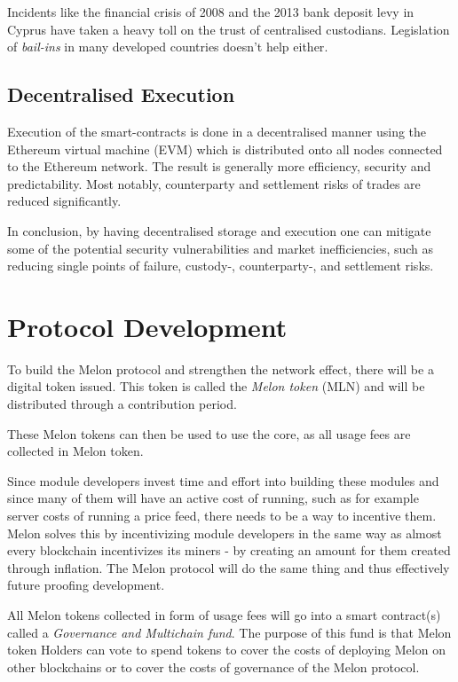 \documentclass[9pt,oneside]{amsart}
\theoremstyle{plain}
\begin{document}
\begin{multicols}{2}
Incidents like the financial crisis of 2008 and the 2013 bank deposit levy in Cyprus have taken a heavy toll on the trust of centralised custodians. Legislation of \textit{bail-ins} in many developed countries doesn't help either\cite{bailinsch}\cite{bailinseu}.

\subsection{Decentralised Execution}

Execution of the smart-contracts is done in a decentralised manner using the Ethereum virtual machine (EVM) which is distributed onto all nodes connected to the Ethereum network. The result is generally more efficiency, security and predictability. Most notably, counterparty and settlement risks of trades are reduced significantly.

In conclusion, by having decentralised storage and execution one can mitigate some of the potential security vulnerabilities and market inefficiencies, such as reducing single points of failure, custody-, counterparty-, and settlement risks.

\section{Protocol Development}\label{sec:protocoldevelopment}

To build the Melon protocol and strengthen the network effect, there will be a digital token issued. This token is called the \textit{Melon token} (MLN) and will be distributed through a contribution period.

These Melon tokens can then be used to use the core, as all usage fees are collected in Melon token. 

Since module developers invest time and effort into building these modules and since many of them will have an active cost of running, such as for example server costs of running a price feed, there needs to be a way to incentive them. Melon solves this by incentivizing module developers in the same way as almost every blockchain incentivizes its miners - by creating an amount for them created through inflation. The Melon protocol will do the same thing and thus effectively future proofing development.

All Melon tokens collected in form of usage fees will go into a smart contract(s) called a \textit{Governance and Multichain fund}. The purpose of this fund is that Melon token Holders can vote to spend tokens to cover the costs of deploying Melon on other blockchains or to cover the costs of governance of the Melon protocol.


\end{multicols}
\end{document}
